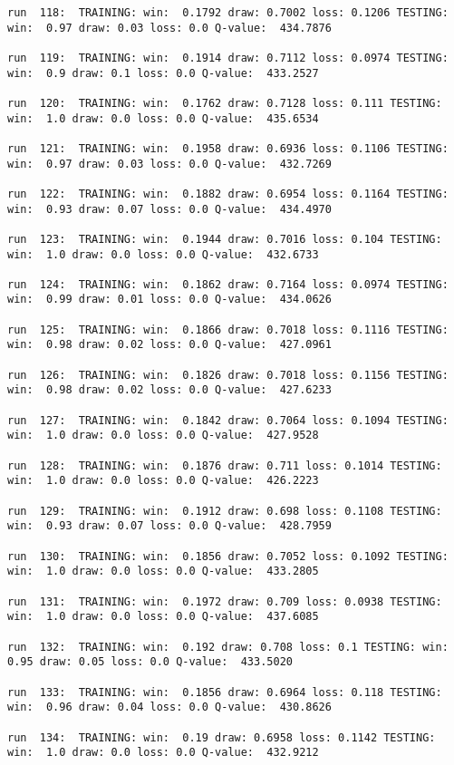 \documentclass[11pt]{article}
\begin{document}
\begin{Verbatim}[commandchars=\\\{\}]
run  118:  TRAINING: win:  0.1792 draw: 0.7002 loss: 0.1206 TESTING: win:  0.97 draw: 0.03 loss: 0.0 Q-value:  434.7876

run  119:  TRAINING: win:  0.1914 draw: 0.7112 loss: 0.0974 TESTING: win:  0.9 draw: 0.1 loss: 0.0 Q-value:  433.2527

run  120:  TRAINING: win:  0.1762 draw: 0.7128 loss: 0.111 TESTING: win:  1.0 draw: 0.0 loss: 0.0 Q-value:  435.6534

run  121:  TRAINING: win:  0.1958 draw: 0.6936 loss: 0.1106 TESTING: win:  0.97 draw: 0.03 loss: 0.0 Q-value:  432.7269

run  122:  TRAINING: win:  0.1882 draw: 0.6954 loss: 0.1164 TESTING: win:  0.93 draw: 0.07 loss: 0.0 Q-value:  434.4970

run  123:  TRAINING: win:  0.1944 draw: 0.7016 loss: 0.104 TESTING: win:  1.0 draw: 0.0 loss: 0.0 Q-value:  432.6733

run  124:  TRAINING: win:  0.1862 draw: 0.7164 loss: 0.0974 TESTING: win:  0.99 draw: 0.01 loss: 0.0 Q-value:  434.0626

run  125:  TRAINING: win:  0.1866 draw: 0.7018 loss: 0.1116 TESTING: win:  0.98 draw: 0.02 loss: 0.0 Q-value:  427.0961

run  126:  TRAINING: win:  0.1826 draw: 0.7018 loss: 0.1156 TESTING: win:  0.98 draw: 0.02 loss: 0.0 Q-value:  427.6233

run  127:  TRAINING: win:  0.1842 draw: 0.7064 loss: 0.1094 TESTING: win:  1.0 draw: 0.0 loss: 0.0 Q-value:  427.9528

run  128:  TRAINING: win:  0.1876 draw: 0.711 loss: 0.1014 TESTING: win:  1.0 draw: 0.0 loss: 0.0 Q-value:  426.2223

run  129:  TRAINING: win:  0.1912 draw: 0.698 loss: 0.1108 TESTING: win:  0.93 draw: 0.07 loss: 0.0 Q-value:  428.7959

run  130:  TRAINING: win:  0.1856 draw: 0.7052 loss: 0.1092 TESTING: win:  1.0 draw: 0.0 loss: 0.0 Q-value:  433.2805

run  131:  TRAINING: win:  0.1972 draw: 0.709 loss: 0.0938 TESTING: win:  1.0 draw: 0.0 loss: 0.0 Q-value:  437.6085

run  132:  TRAINING: win:  0.192 draw: 0.708 loss: 0.1 TESTING: win:  0.95 draw: 0.05 loss: 0.0 Q-value:  433.5020

run  133:  TRAINING: win:  0.1856 draw: 0.6964 loss: 0.118 TESTING: win:  0.96 draw: 0.04 loss: 0.0 Q-value:  430.8626

run  134:  TRAINING: win:  0.19 draw: 0.6958 loss: 0.1142 TESTING: win:  1.0 draw: 0.0 loss: 0.0 Q-value:  432.9212


\end{Verbatim}
\end{document}
